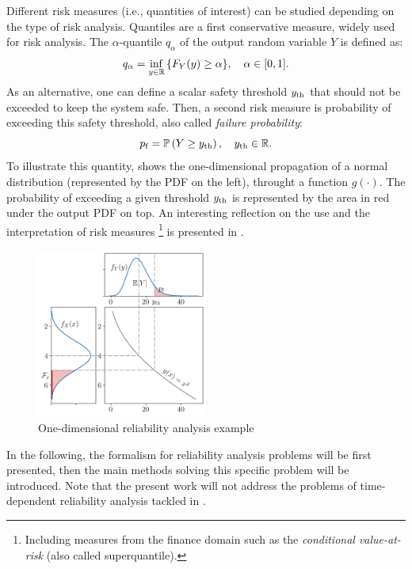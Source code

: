 Different risk measures (i.e., quantities of interest) can be studied depending on the type of risk analysis. 
Quantiles are a first conservative measure, widely used for risk analysis. 
The $\alpha$-quantile $q_\alpha$ of the output random variable $Y$ is defined as:
\begin{equation}
    q_\alpha = \inf_{y\in\mathbb{R}}{\left\{F_Y(y) \geq \alpha\right\}}, \quad \alpha \in [0, 1].    
\end{equation}
As an alternative, one can define a scalar safety threshold $y_\mathrm{th}$ that should not be exceeded to keep the system safe. 
Then, a second risk measure is probability of exceeding this safety threshold, also called \textit{failure probability}: 
\begin{equation}
    p_\mathrm{f} = \mathbb{P}\left(Y \geq y_\mathrm{th}\right), \quad y_\mathrm{th}\in\mathbb{R}.
\end{equation}
To illustrate this quantity,  shows the one-dimensional propagation of a normal distribution (represented by the PDF on the left), throught a function $g(\cdot)$.
The probability of exceeding a given threshold $y_\mathrm{th}$ is represented by the area in red under the output PDF on top.
An interesting reflection on the use and the interpretation of risk measures
\footnote{Including measures from the finance domain such as the \textit{conditional value-at-risk} (also called superquantile).} 
is presented in \citet{rockafellar_2015}. 

\begin{figure}
    \centering
    \includegraphics[width=0.5\textwidth]{../numerical_experiments/chapter1/figures/1D_reliability.png}
    \caption{One-dimensional reliability analysis example}
    \label{fig:1D_reliability}
\end{figure}

In the following, the formalism for reliability analysis problems will be first presented, 
then the main methods solving this specific problem will be introduced.
Note that the present work will not address the problems of time-dependent reliability analysis tackled in \citet{hawchar_2017}. 

